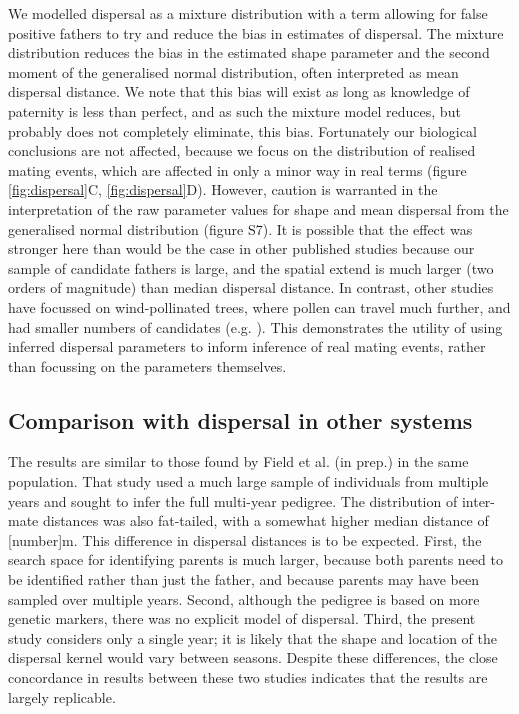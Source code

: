 \documentclass[10pt, a4paper, twocolumn]{article} %
\begin{document}
We modelled dispersal as a mixture distribution with a term allowing for false positive fathers to try and reduce the bias in estimates of dispersal.
The mixture distribution reduces the bias in the estimated shape parameter and the second moment of the generalised normal distribution, often interpreted as mean dispersal distance.
We note that this bias will exist as long as knowledge of paternity is less than perfect, and as such the mixture model reduces, but probably does not completely eliminate, this bias. 
Fortunately our biological conclusions are not affected, because we focus on the distribution of realised mating events, which are affected in only a minor way in real terms (figure \ref{fig:dispersal}C, \ref{fig:dispersal}D).
However, caution is warranted in the interpretation of the raw parameter values for shape and mean dispersal from the generalised normal distribution (figure S7).
It is possible that the effect was stronger here than would be the case in other published studies because our sample of candidate fathers is large, and the spatial extend is much larger (two orders of magnitude) than median dispersal distance.
In contrast, other studies have focussed on wind-pollinated trees, where pollen can travel much further, and had smaller numbers of candidates (e.g. \cite{adams1992using, austerlitz2004using, klein2008pollen}).
This demonstrates the utility of using inferred dispersal parameters to inform inference of real mating events, rather than focussing on the parameters themselves.

\subsection{Comparison with dispersal in other systems}

The results are similar to those found by Field et al. (in prep.) in the same population.
That study used a much large sample of individuals from multiple years and sought to infer the full multi-year pedigree.
The distribution of inter-mate distances was also fat-tailed, with a somewhat higher median distance of [number]m.
This difference in dispersal distances is to be expected.
First, the search space for identifying parents is much larger, because both parents need to be identified rather than just the father, and because parents may have been sampled over multiple years.
Second, although the pedigree is based on more genetic markers, there was no explicit model of dispersal.
Third, the present study considers only a single year; it is likely that the shape and location of the dispersal kernel would vary between seasons.
Despite these differences, the close concordance in results between these two studies indicates that the results are largely replicable.
\end{document}
